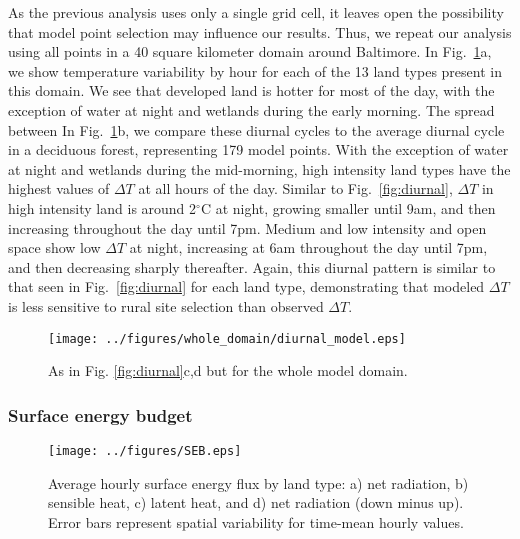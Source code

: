\documentclass[draft,linenumbers]{agujournal}
\begin{document}
As the previous analysis uses only a single grid cell, it leaves open the possibility that model point selection may influence our results. Thus, we repeat our analysis using all points in a 40 square kilometer domain around Baltimore. In Fig.~\ref{fig:diurnal_wd}a, we show temperature variability by hour for each of the 13 land types present in this domain. We see that developed land is hotter for most of the day, with the exception of water at night and wetlands during the early morning. The spread between 
In Fig.~\ref{fig:diurnal_wd}b, we compare these diurnal cycles to the average diurnal cycle in a deciduous forest, representing 179 model points. With the exception of water at night and wetlands during the mid-morning, high intensity land types have the highest values of $\Delta T$ at all hours of the day. Similar to Fig.~\ref{fig:diurnal}, $\Delta T$ in high intensity land is around 2$^\circ$C at night, growing smaller until 9am, and then increasing throughout the day until 7pm. Medium and low intensity and open space show low $\Delta T$ at night, increasing at 6am throughout the day until 7pm, and then decreasing sharply thereafter. Again, this diurnal pattern is similar to that seen in Fig.~\ref{fig:diurnal} for each land type, demonstrating that modeled $\Delta T$ is less sensitive to rural site selection than observed $\Delta T$. 

\begin{figure}[h]
\centering
\texttt{[image: ../figures/whole\_domain/diurnal\_model.eps]}
\caption{As in Fig. \ref{fig:diurnal}c,d but for the whole model domain.}%
\label{fig:diurnal_wd}
\end{figure}

 
\subsubsection{Surface energy budget}

\begin{figure}[h]
\centering
\texttt{[image: ../figures/SEB.eps]}
\caption{Average hourly surface energy flux by land type: a) net radiation, b) sensible heat, c) latent heat, and d) net radiation (down minus up). Error bars represent spatial variability for time-mean hourly values.}
\label{fig:seb}
\end{figure}
\end{document}
